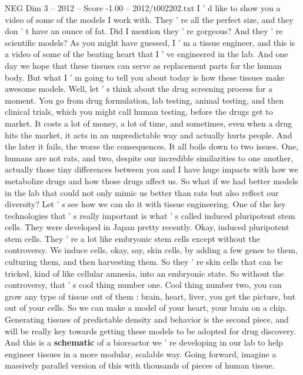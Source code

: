 \begin{textsample}{NEG Dim 3 – 2012 – Score -1.00 – 2012/t002202.txt}  \label{ex:f3_neg_037}
I ' d like to show you a video of some of the models I work with.
They ' re all the perfect size, and they don ' t have an ounce of fat.
Did I mention they ' re gorgeous?
And they ' re scientific models?
As you might have guessed, I ' m a tissue engineer, and this is a video of some of the beating heart that I ' ve engineered in the lab.
And one day we hope that these tissues can serve as replacement parts for the human body.
But what I ' m going to tell you about today is how these tissues make awesome models.
Well, let ' s think about the drug screening process for a moment.
You go from drug formulation, lab testing, animal testing, and then clinical trials, which you might call human testing, before the drugs get to market.
It costs a lot of money, a lot of time, and sometimes, even when a drug hits the market, it acts in an unpredictable way and actually hurts people.
And the later it fails, the worse the consequences.
It all boils down to two issues.
One, humans are not rats, and two, despite our incredible similarities to one another, actually those tiny differences between you and I have huge impacts with how we metabolize drugs and how those drugs affect us.
So what if we had better models in the lab that could not only mimic us better than rats but also reflect our diversity?
Let ' s see how we can do it with tissue engineering.
One of the key technologies that ' s really important is what ' s called induced pluripotent stem cells.
They were developed in Japan pretty recently.
Okay, induced pluripotent stem cells.
They ' re a lot like embryonic stem cells except without the controversy.
We induce cells, okay, say, skin cells, by adding a few genes to them, culturing them, and then harvesting them.
So they ' re skin cells that can be tricked, kind of like cellular amnesia, into an embryonic state.
So without the controversy, that ' s cool thing number one.
Cool thing number two, you can grow any type of tissue out of them : brain, heart, liver, you get the picture, but out of your cells.
So we can make a model of your heart, your brain on a chip.
Generating tissues of predictable density and behavior is the second piece, and will be really key towards getting these models to be adopted for drug discovery.
And this is a \textbf{schematic} of a bioreactor we ' re developing in our lab to help engineer tissues in a more modular, scalable way.
Going forward, imagine a massively parallel version of this with thousands of pieces of human tissue.

\end{textsample}
